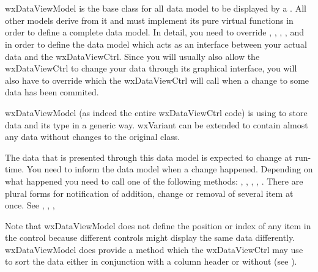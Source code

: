 
\section{}\label{wxdataviewmodel}

wxDataViewModel is the base class for all data model to be
displayed by a . 
All other models derive from it and must implement its
pure virtual functions in order to define a complete
data model. In detail, you need to override 
,
,
,
,
 and
 in order to
define the data model which acts as an interface between 
your actual data and the wxDataViewCtrl. Since you will
usually also allow the wxDataViewCtrl to change your data
through its graphical interface, you will also have to override
 which the
wxDataViewCtrl will call when a change to some data has been
commited.

wxDataViewModel (as indeed the entire wxDataViewCtrl
code) is using  to store data and
its type in a generic way. wxVariant can be extended to contain
almost any data without changes to the original class.

The data that is presented through this data model is expected
to change at run-time. You need to inform the data model when
a change happened. Depending on what happened you need to call
one of the following methods: 
,
,
,
,
. There are
plural forms for notification of addition, change
or removal of several item at once. See 
,
,
,

Note that wxDataViewModel does not define the position or
index of any item in the control because different controls
might display the same data differently. wxDataViewModel does
provide a  method
which the wxDataViewCtrl may use to sort the data either
in conjunction with a column header or without (see
).

